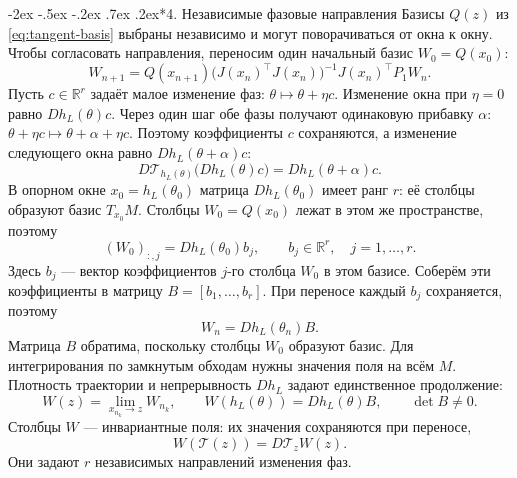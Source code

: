 \documentclass[11pt,a4paper]{article}
\makeatletter
\renewcommand\section{\@startsection{section}{1}{\z@}%
  {-2ex \@plus -.5ex \@minus -.2ex}%
  {.7ex \@plus .2ex}{\normalfont\Large\bfseries}}
\makeatother
\begin{document}
\section*{4. Независимые фазовые направления}
Базисы $Q(z)$ из \eqref{eq:tangent-basis} выбраны независимо
и могут поворачиваться от окна к окну.
Чтобы согласовать направления, переносим один начальный базис $W_0=Q(x_0)$:
\begin{equation}
W_{n+1}=Q(x_{n+1})
\bigl(J(x_n)^\top J(x_n)\bigr)^{-1}J(x_n)^\top P_1W_n.
\label{eq:frame-transport}
\end{equation}
Пусть $c\in\mathbb R^r$ задаёт малое изменение фаз:
$\theta\mapsto\theta+\eta c$. Изменение окна при $\eta=0$ равно $Dh_L(\theta)c$.
Через один шаг обе фазы получают одинаковую прибавку $\alpha$:
$\theta+\eta c\mapsto\theta+\alpha+\eta c$. Поэтому коэффициенты $c$
сохраняются, а изменение следующего окна равно $Dh_L(\theta+\alpha)c$:
$$
D\mathcal T_{h_L(\theta)}\bigl(Dh_L(\theta)c\bigr)
=Dh_L(\theta+\alpha)c.
$$
В опорном окне $x_0=h_L(\theta_0)$ матрица $Dh_L(\theta_0)$ имеет ранг $r$:
её столбцы образуют базис $T_{x_0}M$.
Столбцы $W_0=Q(x_0)$ лежат в этом же пространстве, поэтому
$$
(W_0)_{:,j}=Dh_L(\theta_0)b_j,\qquad b_j\in\mathbb R^r,\quad j=1,\ldots,r.
$$
Здесь $b_j$ --- вектор коэффициентов $j$-го столбца $W_0$ в этом базисе.
Соберём эти коэффициенты в матрицу $B=[b_1,\ldots,b_r]$.
При переносе каждый $b_j$ сохраняется, поэтому
$$
W_n=Dh_L(\theta_n)B.
$$
Матрица $B$ обратима, поскольку столбцы $W_0$ образуют базис.
Для интегрирования по замкнутым обходам нужны значения поля на всём $M$.
Плотность траектории и непрерывность $Dh_L$ задают единственное продолжение:
\begin{equation}
W(z)=\lim_{x_{n_k}\to z}W_{n_k},\qquad
W(h_L(\theta))=Dh_L(\theta)B,\qquad \det B\ne0.
\label{eq:invariant-frame}
\end{equation}
Столбцы $W$ --- инвариантные поля: их значения сохраняются при переносе,
\begin{equation}
W(\mathcal T(z))=D\mathcal T_zW(z).
\label{eq:invariant-kernel}
\end{equation}
Они задают $r$ независимых направлений изменения фаз.
\end{document}
